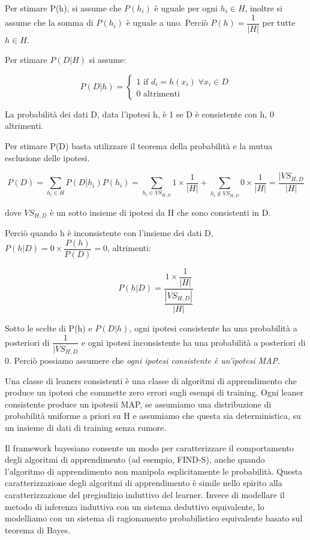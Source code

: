 \documentclass[a4paper]{extarticle}
\begin{document}
Per stimare P(h), si assume che $P(h_i)$ è uguale per ogni $h_i \in H$, inoltre si assume che la somma di $P(h_i)$ è uguale a uno. Perciò $P(h) = \dfrac{1}{|H|}$ per tutte $h\in H$.

Per stimare $P(D|H)$ si assume:

\begin{equation*}
	P(D|h) = 
	\begin{cases}
		1 \text{ if }  d_i = h(x_i) \; \forall x_i \in D \\
		0 \text{ altrimenti}
	\end{cases}
\end{equation*}

La probabilità dei dati D, data l'ipotesi h, è 1 se D è consistente con h, 0 altrimenti.

Per stimare P(D) basta utilizzare il teorema della probabilità e la mutua esclusione delle ipotesi.

\begin{equation*}
P(D) = \sum\limits_{h_i \in H} P(D|h_i)P(h_i) = \sum\limits_{h_i \in VS_{H,D}} 1 \times \dfrac{1}{|H|}+ \sum \limits_{h_i \not \in VS_{H,D}} 0\times \dfrac{1}{|H|} = \dfrac{|VS_{H,D}}{|H|}
\end{equation*}

dove $VS_{H,D}$ è un sotto insieme di ipotesi da H che sono consistenti in D.

Perciò quando h è inconsistente con l'insieme dei dati D, $P(h|D) = 0 \times \dfrac{P(h)}{P(D)} = 0$, altrimenti:

\begin{equation*}
P(h|D) = \dfrac{1 \times \dfrac{1}{|H|}}{\dfrac{|VS_{H,D}|}{|H|}}
\end{equation*}

Sotto le scelte di P(h) e $P(D|h)$, ogni ipotesi consistente ha una probabilità a posteriori di $\dfrac{1}{|VS_{H,D}}$ e ogni ipotesi inconsistente ha una probabilità a posteriori di 0. Perciò possiamo assumere che \textit{ogni ipotesi consistente è un'ipotesi MAP.}

Una classe di leaners consistenti è una classe di algoritmi di apprendimento che produce un ipotesi che commette zero errori sugli esempi di training. Ogni leaner consistente produce un ipotesii MAP, se assumiamo una distribuzione di probabilità uniforme a priori su H e assumiamo che questa sia deterministica, su un insieme di dati di training senza rumore.

Il framework bayesiano consente un modo per caratterizzare il comportamento degli algoritmi di apprendimento (ad esempio, FIND-S), anche quando l'algoritmo di apprendimento non manipola esplicitamente le probabilità. Questa caratterizzazione degli algoritmi di apprendimento è simile nello spirito alla caratterizzazione del pregiudizio induttivo del learner. Invece di modellare il metodo di inferenza induttiva con un sistema deduttivo equivalente, lo modelliamo con un sistema di ragionamento probabilistico equivalente basato sul teorema di Bayes.
\end{document}
